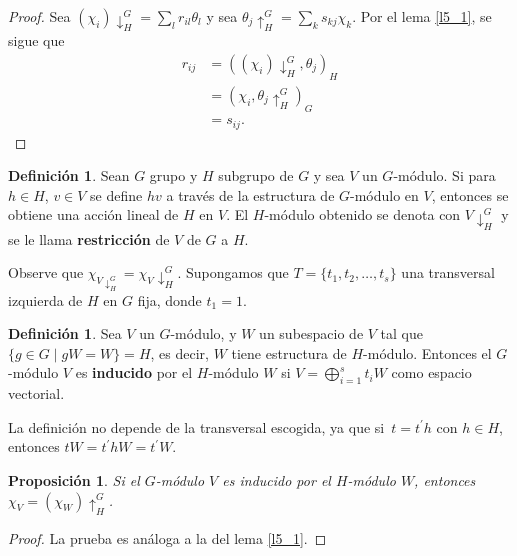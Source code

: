 \documentclass[12pt]{book}
\newtheorem{proposition}[theorem]{Proposición}
\theoremstyle{definition}
\newtheorem{definition}[theorem]{Definición}
\newcounter{in}
\newcounter{ini}
\begin{document}
\begin{proof}
  Sea $(\chi_{i})\downarrow^{G}_{H} = \sum_{l} r_{il} \theta_{l}$ y sea
  $\theta_{j}\uparrow^{G}_{H} = \sum_{k} s_{kj} \chi_{k}$. Por el lema \ref{l5_1}, se
  sigue que
  \begin{equation}
    \label{eq:66}
    \begin{aligned}
      r_{ij} &= ((\chi_{i})\downarrow^{G}_{H},\theta_{j})_{H} \\
      &= (\chi_{i},\theta_{j}\uparrow^{G}_{H})_{G}\\
      &= s_{ij}.
    \end{aligned}
  \end{equation}
\end{proof}
\begin{mdframed}
\begin{definition}
  Sean $G$ grupo y $H$ subgrupo de $G$ y sea $V$ un $G$-módulo. 
  Si para $h\in H$, $v\in V$ se define $hv$ a través de la estructura de
  $G$-módulo en $V$, entonces se obtiene una acción lineal de $H$ en $V$. El
  $H$-módulo obtenido se denota con $V\downarrow^{G}_{H}$ y se le
  llama \textbf{restricción} de $V$ de $G$ a $H$.
\end{definition}
Observe que
$\chi_{V\downarrow^{G}_{H}}=\chi_{V}\!\downarrow^{G}_{H}$. Supongamos
que $T=\{t_{1},t_{2},\ldots,t_{s}\}$ una transversal izquierda de $H$
en $G$ fija, donde $t_{1}=1$.
\begin{definition}
\label{mod_ind}
  Sea $V$ un $G$-módulo, y $W$ un subespacio de $V$ tal que $\{g\in
  G\mid gW=W\}=H$, es decir, $W$ tiene estructura de $H$-módulo. Entonces el
  $G$-módulo $V$ es \textbf{inducido} por el $H$-módulo $W$ si
  $V=\bigoplus^{s}_{i=1}t_{i}W$ como espacio vectorial.
\end{definition}
La definición no depende de la transversal escogida, ya que
si~$t=t^{'}h$ con $h\in H$, entonces $tW=t^{'}hW=t^{'}W$.
\begin{proposition}
  \label{car-ind-W-V}
  Si el $G$-módulo $V$ es inducido por el $H$-módulo $W$, entonces
  $\chi_{V}=(\chi_{W})\uparrow^{G}_{H}$.
\end{proposition}
\begin{proof}
La prueba es análoga a la del lema \ref{l5_1}.
\end{proof}
\end{mdframed}
\end{document}
